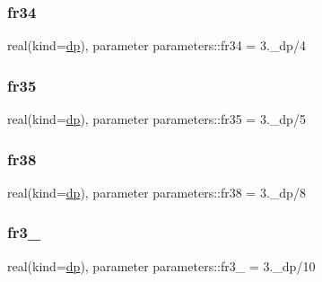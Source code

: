 \mbox{\label{group__FRACTIONS_ga8f9972a5fa3d36c2893e702ab70c7fff}} 
\subsubsection{\texorpdfstring{fr34}{fr34}}
{\footnotesize\ttfamily real(kind=\mbox{\hyperlink{namespaceparameters_a52f8c6351fd79345d8811e065bcbbb37}{dp}}), parameter parameters\+::fr34 = 3.\+\_\+dp/4}

\mbox{\label{group__FRACTIONS_ga51fd0944911031e89f45e11247545886}} 
\subsubsection{\texorpdfstring{fr35}{fr35}}
{\footnotesize\ttfamily real(kind=\mbox{\hyperlink{namespaceparameters_a52f8c6351fd79345d8811e065bcbbb37}{dp}}), parameter parameters\+::fr35 = 3.\+\_\+dp/5}

\mbox{\label{group__FRACTIONS_ga7fcdf682bf3d4c7901343542bcee3976}} 
\subsubsection{\texorpdfstring{fr38}{fr38}}
{\footnotesize\ttfamily real(kind=\mbox{\hyperlink{namespaceparameters_a52f8c6351fd79345d8811e065bcbbb37}{dp}}), parameter parameters\+::fr38 = 3.\+\_\+dp/8}

\mbox{\label{group__FRACTIONS_gadb8dc3cfa1864abcbb3226845f3d1953}} 
\subsubsection{\texorpdfstring{fr3\+\_}{fr3\_10}}
{\footnotesize\ttfamily real(kind=\mbox{\hyperlink{namespaceparameters_a52f8c6351fd79345d8811e065bcbbb37}{dp}}), parameter parameters\+::fr3\+\_ = 3.\+\_\+dp/10}

